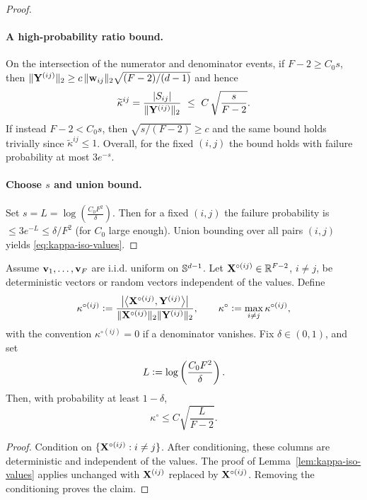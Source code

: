 \begin{proof}
\paragraph{A high-probability ratio bound.}
On the intersection of the numerator and denominator events, if $F-2\ge C_{0} s$,
then $\|\mathbf{Y}^{(ij)}\|_{2}\ge c\,\|{\mathbf{w}}_{ij}\|_{2}\sqrt{(F-2)/(d-1)}$ and hence
\[
\widetilde{\kappa}^{ij}=\frac{|S_{ij}|}{\|\vY^{(ij)}\|_2}\ \le\ C\,\sqrt{\frac{s}{F-2}}.
\]
If instead $F-2< C_{0} s$, then $\sqrt{s/(F-2)}\ge c$ and the same bound holds trivially since $\widetilde{\kappa}^{ij}\le 1$.
Overall, for the fixed $(i,j)$ the bound holds with failure probability at most $3e^{-s}$.

\paragraph{Choose $s$ and union bound.}
Set $s=L=\log(\tfrac{C_{0} F^2}{\delta})$.
Then for a fixed $(i,j)$ the failure probability is $\le 3e^{-L}\le \delta/F^2$ (for $C_{0}$ large enough).
Union bounding over all pairs $(i,j)$ yields \eqref{eq:kappa-iso-values}.
\end{proof}


\begin{lemma}
\label{lem:kappa-centered-iso-values}
Assume \({\mathbf{v}}_1,\dots,{\mathbf{v}}_F\) are i.i.d. uniform on \(\mathbb{S}^{d-1}\). Let
\(\mathbf{X}^{\circ(ij)}\in\mathbb{R}^{F-2}\), \(i\neq j\), be deterministic vectors or random
vectors independent of the values. Define
\[
\kappa^{\circ(ij)}
\vcentcolon=
\frac{\left|\left\langle \mathbf{X}^{\circ(ij)},\mathbf{Y}^{(ij)}\right\rangle\right|}
{\|\mathbf{X}^{\circ(ij)}\|_2\|\mathbf{Y}^{(ij)}\|_2},
\qquad
\kappa^\circ\vcentcolon=\max_{i\neq j}\kappa^{\circ(ij)},
\]
with the convention \(\kappa^{\circ(ij)}=0\) if a denominator vanishes. Fix
\(\delta\in(0,1)\), and set
\[
L\vcentcolon= \log\left(\frac{C_0F^2}{\delta}\right).
\]
Then, with probability at least \(1-\delta\),
\[
\kappa^\circ\le C\sqrt{\frac{L}{F-2}}.
\]
\end{lemma}

\begin{proof}
Condition on \(\{\mathbf{X}^{\circ(ij)}:i\neq j\}\). After conditioning, these columns
are deterministic and independent of the values. The proof of
Lemma~\ref{lem:kappa-iso-values} applies unchanged with \(\mathbf{X}^{(ij)}\) replaced
by \(\mathbf{X}^{\circ(ij)}\). Removing the conditioning proves the claim.
\end{proof}


